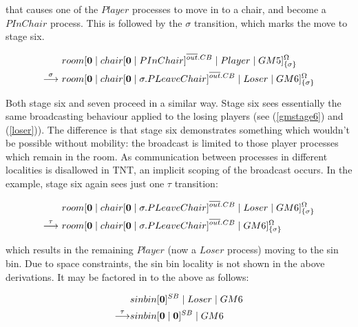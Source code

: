 \noindent that causes one of the $Player$ processes to move in to a
chair, and become a $PInChair$ process.  This is followed by the
$\sigma$ transition, which marks the move to stage six.

\begin{equation}
\begin{aligned}
&  {room}[ \textbf{0} \;|\; {chair}[ \textbf{0} \;|\; PInChair ]^{\overline{out}.CB} \;|\; 
   Player \;|\;
   GM5 ]^{\Omega}_{\{\sigma\}} \\
\stackrel{\sigma}{\longrightarrow}\ & {room}[ \textbf{0} \;|\; {chair}[ \textbf{0} \;|\; \sigma.PLeaveChair ]^{\overline{out}.CB} \;|\; 
   Loser \;|\;
   GM6 ]^{\Omega}_{\{\sigma\}} \\
\end{aligned}
\end{equation}

Both stage six and seven proceed in a similar way.  Stage six sees
essentially the same broadcasting behaviour applied to the losing
players (see (\ref{gmstage6}) and (\ref{loser})).  The difference is
that stage six demonstrates something which wouldn't be possible without
mobility: the broadcast is limited to those player processes which
remain in the room.  As communication between processes in different
localities is disallowed in TNT, an implicit scoping of the broadcast
occurs.  In the example, stage six again sees just one $\tau$
transition:

\begin{equation}
\begin{aligned}
&  {room}[ \textbf{0} \;|\; {chair}[ \textbf{0} \;|\; \sigma.PLeaveChair ]^{\overline{out}.CB} \;|\; 
   Loser \;|\;
   GM6 ]^{\Omega}_{\{\sigma\}} \\
\stackrel{\tau}{\longrightarrow}\ & {room}[ \textbf{0} \;|\; {chair}[ \textbf{0} \;|\; \sigma.PLeaveChair ]^{\overline{out}.CB} \;|\;
   GM6 ]^{\Omega}_{\{\sigma\}} \\
\end{aligned}
\end{equation}

\noindent which results in the remaining $Player$ (now a $Loser$
process) moving to the sin bin.  Due to space constraints, the sin bin
locality is not shown in the above derivations.  It may be factored in
to the above as follows:

\begin{equation}
\begin{aligned}
& {sinbin}[ \textbf{0} ]^{SB} \;|\; Loser \;|\; GM6 \\
\stackrel{\tau}{\longrightarrow} & {sinbin}[ \textbf{0} \;|\; \textbf{0} ]^{SB} \;|\; GM6
\end{aligned}
\end{equation}

